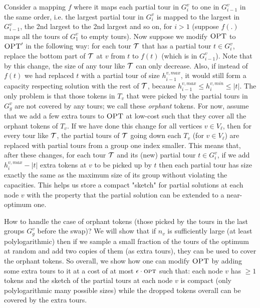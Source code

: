 \documentclass[twoside,leqno]{article}
\newcommand{\calT}{{\cal T}}
\newcommand{\opt}{\mbox{\sc opt}}
\newcommand{\OPT}{\mbox{\sc OPT}}
\newcommand{\eps}{\epsilon}
\begin{document}
Consider a mapping $f$ where it maps each partial tour in $G^v_i$ to one in $G^v_{i-1}$ in the same order, i.e. the largest partial tour in $G^v_{i}$ is mapped to the largest in $G^v_{i-1}$, the 2nd largest to the 2nd largest and so on, for $i>1$ (suppose $f(.)$ maps all the tours of $G^v_1$ to empty tours).
Now suppose we modify $\OPT$ to  $\OPT'$ in the following way: for each tour $\calT$ that has a partial
tour $t\in G^v_i$, replace the bottom part of $\calT$ at $v$ from $t$ to $f(t)$ (which is in $G^v_{i-1}$).
Note that by this change, the size of any tour like $\calT$ can only decrease.
Also, if instead of $f(t)$ we had replaced $t$ with a partial
tour of size $h^{v,max}_{i-1}$, it would still form a capacity respecting solution with the rest of $\calT$,
because $h^{v,max}_{i-1}\leq h^{v,min}_i\leq |t|$. The only problem is that those tokens in $T_v$ that were picked
by the partial tours in $G^v_g$ are not covered by any tours; we call these {\em orphant} tokens.
For now, assume that we add a few extra tours to $\OPT$ at low-cost such that they cover all the orphant tokens of $T_v$.
If we have done this change for all vertices $v\in V_\ell$, then for every  tour like $\calT$,
the partial tours of $\calT$ going down each $T_v$ (for $v\in V_\ell$) are replaced with partial tours from a group
one index smaller.
This means that, after these changes,
for each tour $\calT$ and its (new) partial tour $t\in G^v_i$, if we add $h^{v,max}_i-|t|$ extra tokens at $v$ to be picked up by $t$ then each partial tour has size exactly the same as the maximum size of its group without violating the capacities.
This helps us store a compact "sketch"
for partial solutions
at each node $v$ with the property that the partial solution can be extended to a near-optimum one.

How to handle the case of orphant tokens (those picked by the tours in the last groups $G^v_g$ before the swap)?
We will show that if $n_v$ is sufficiently large (at least polylogarithmic) then if we sample a small fraction of the tours of the optimum at random and add two copies of them (as extra tours), they
can be used to cover the orphant tokens. So overall, we show how one can modify $\OPT$ by adding some extra tours to it
at a cost of at most $\eps\cdot\opt$ such that: each node $v$ has $\geq 1$ tokens and
the sketch of the partial tours at each node $v$ is compact (only polylogarithmic many possible sizes) while the dropped tokens overall can be covered by the extra tours.

\end{document}
